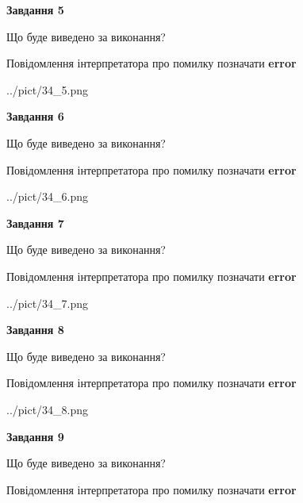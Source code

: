 \documentclass[11pt, ukrainian]{article}
\begin{document}
{\begin {large}
{\begin {center}\textbf{Завдання 5}\end {center}}\par
Що буде виведено за виконання? \par
Повідомлення інтерпретатора про помилку позначати \textbf{error}

\begin{center}
	{../pict/34_5.png}
\end{center}
\newpage

{\begin {center}\textbf{Завдання 6}\end {center}}\par
Що буде виведено за виконання? \par
Повідомлення інтерпретатора про помилку позначати \textbf{error}

\begin{center}
	{../pict/34_6.png}
\end{center}
\newpage

{\begin {center}\textbf{Завдання 7}\end {center}}\par
Що буде виведено за виконання? \par
Повідомлення інтерпретатора про помилку позначати \textbf{error}

\begin{center}
	{../pict/34_7.png}
\end{center}
\newpage

{\begin {center}\textbf{Завдання 8}\end {center}}\par
Що буде виведено за виконання? \par
Повідомлення інтерпретатора про помилку позначати \textbf{error}

\begin{center}
	{../pict/34_8.png}
\end{center}
\newpage

{\begin {center}\textbf{Завдання 9}\end {center}}\par
Що буде виведено за виконання? \par
Повідомлення інтерпретатора про помилку позначати \textbf{error}


\end{large}}
\end{document}
